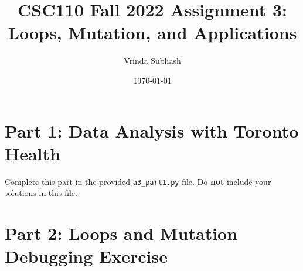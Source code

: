 \documentclass[11pt]{article}
\title{CSC110 Fall 2022 Assignment 3: Loops, Mutation, and Applications}
\author{Vrinda Subhash}
\date{\today}
\begin{document}
\maketitle

\section*{Part 1: Data Analysis with Toronto Health}

Complete this part in the provided \texttt{a3\_part1.py} file.
Do \textbf{not} include your solutions in this file.

\section*{Part 2: Loops and Mutation Debugging Exercise}
\end{document}
